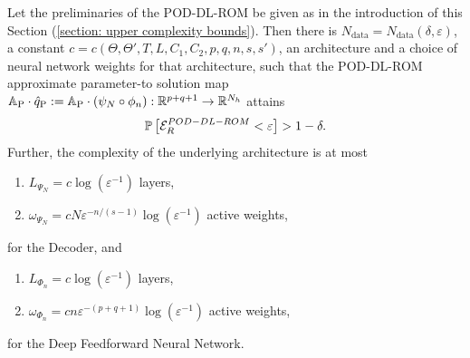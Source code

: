 \begin{theorem} \label{theo: PAC bound for POD-DL-ROM}
    Let the preliminaries of the POD-DL-ROM be given as in the introduction of this Section 
    (\ref{section: upper complexity bounds}).
    Then there is $N_\text{data} = N_\text{data}(\delta, \varepsilon)$, 
    a constant $c = c(\Theta, \Theta', T, L, C_1, C_2, p, q, n, s, s')$,
    an architecture and a choice of neural network weights for that architecture, such that 
    the POD-DL-ROM approximate parameter-to solution map $\mathbb{A}_\text{P} \cdot \hat{q}_\text{P} :=
    \mathbb{A}_\text{P} \cdot (\psi_N \circ \phi_n): \mathbb{R}^{p+q+1} \to \mathbb{R}^{N_h}$ 
    attains
    \begin{equation*}
        \mathbb{P}\left[\mathcal{E}^{POD-DL-ROM}_R < \varepsilon\right] > 1 - \delta.
    \end{equation*}
    Further, the complexity of the underlying architecture is at most
    \begin{enumerate}
        \item[-] $L_{\Psi_N} = c \log(\varepsilon^{-1})$ layers,
        \item[-] $\omega_{\Psi_N} = cN \varepsilon^{-n/(s-1)} \log(\varepsilon^{-1})$ active weights,
    \end{enumerate}
    for the Decoder, and 
    \begin{enumerate}
        \item[-] $L_{\Phi_n} = c \log(\varepsilon^{-1})$ layers,
        \item[-] $\omega_{\Phi_n} = cn \varepsilon^{-(p+q+1)} \log(\varepsilon^{-1})$ active weights,
    \end{enumerate}
    for the Deep Feedforward Neural Network.
\end{theorem}
